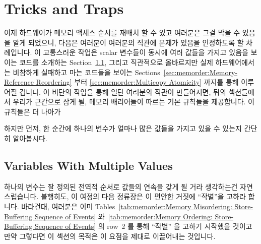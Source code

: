 \section{Tricks and Traps}
\label{sec:memorder:Tricks and Traps}

이제 하드웨어가 메모리 액세스 순서를 재배치 할 수 있고 여러분은 그걸 막을 수
있음을 알게 되었으니, 다음은 여러분이 여러분의 직관에 문제가 있음을 인정하도록
할 차례입니다.
이 고통스러운 작업은 scalar 변수들이 동시에 여러 값들을 가지고 있음을 보이는
코드를 소개하는
Section~\ref{sec:memorder:Variables With Multiple Values}, 그리고
직관적으로 올바르지만 실제 하드웨어에서는 비참하게 실패하고 마는 코드들을
보이는
Sections~\ref{sec:memorder:Memory-Reference Reordering} 부터
\ref{sec:memorder:Multicopy Atomicity} 까지를 통해 이루어질 겁니다.
이 비탄의 작업을 통해 일단 여러분의 직관이 만들어지면, 뒤의 섹션들에서 우리가
근간으로 삼게 될, 메모리 배리어들이 따르는 기본 규칙들을 제공합니다.
이 규칙들은 더 나아가

하지만 먼저, 한 순간에 하나의 변수가 얼마나 많은 값들을 가지고 있을 수 있는지
간단히 알아봅시다.

\subsection{Variables With Multiple Values}
\label{sec:memorder:Variables With Multiple Values}

하나의 변수는 잘 정의된 전역적 순서로 값들의 연속을 갖게 될 거라 생각하는건
자연스럽습니다.
불행히도, 이 여정의 다음 정류장은 이 편안한 거짓에 ``작별''을 고하라 합니다.
바라건대, 여러분은 이미
Tables~\ref{tab:memorder:Memory Misordering: Store-Buffering Sequence of Events}
와~\ref{tab:memorder:Memory Ordering: Store-Buffering Sequence of Events} 의
row~2 를 통해 ``작별'' 을 고하기 시작했을 것이고 만약 그렇다면 이 섹션의 목적은
이 요점을 제대로 이끌어내는 것입니다.
\iffalse

